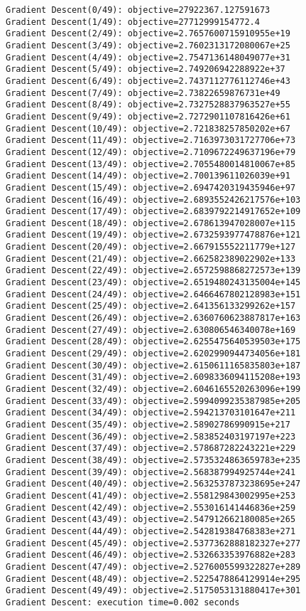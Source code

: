 \documentclass[11pt]{article}
\begin{document}
    \begin{Verbatim}[commandchars=\\\{\}]
Gradient Descent(0/49): objective=27922367.127591673
Gradient Descent(1/49): objective=27712999154772.4
Gradient Descent(2/49): objective=2.7657600715910955e+19
Gradient Descent(3/49): objective=2.7602313172080067e+25
Gradient Descent(4/49): objective=2.7547136148049077e+31
Gradient Descent(5/49): objective=2.749206942288922e+37
Gradient Descent(6/49): objective=2.7437112776112746e+43
Gradient Descent(7/49): objective=2.73822659876731e+49
Gradient Descent(8/49): objective=2.7327528837963527e+55
Gradient Descent(9/49): objective=2.7272901107816426e+61
Gradient Descent(10/49): objective=2.721838257850202e+67
Gradient Descent(11/49): objective=2.7163973031727706e+73
Gradient Descent(12/49): objective=2.7109672249637196e+79
Gradient Descent(13/49): objective=2.7055480014810067e+85
Gradient Descent(14/49): objective=2.700139611026039e+91
Gradient Descent(15/49): objective=2.6947420319435946e+97
Gradient Descent(16/49): objective=2.6893552426217576e+103
Gradient Descent(17/49): objective=2.6839792214917652e+109
Gradient Descent(18/49): objective=2.678613947028007e+115
Gradient Descent(19/49): objective=2.6732593977478876e+121
Gradient Descent(20/49): objective=2.667915552211779e+127
Gradient Descent(21/49): objective=2.662582389022902e+133
Gradient Descent(22/49): objective=2.6572598868272573e+139
Gradient Descent(23/49): objective=2.6519480243135004e+145
Gradient Descent(24/49): objective=2.6466467802128983e+151
Gradient Descent(25/49): objective=2.641356133299262e+157
Gradient Descent(26/49): objective=2.6360760623887817e+163
Gradient Descent(27/49): objective=2.630806546340078e+169
Gradient Descent(28/49): objective=2.6255475640539503e+175
Gradient Descent(29/49): objective=2.6202990944734056e+181
Gradient Descent(30/49): objective=2.6150611165835803e+187
Gradient Descent(31/49): objective=2.6098336094115208e+193
Gradient Descent(32/49): objective=2.6046165520263096e+199
Gradient Descent(33/49): objective=2.5994099235387985e+205
Gradient Descent(34/49): objective=2.594213703101647e+211
Gradient Descent(35/49): objective=2.58902786990915e+217
Gradient Descent(36/49): objective=2.583852403197197e+223
Gradient Descent(37/49): objective=2.578687282243221e+229
Gradient Descent(38/49): objective=2.5735324863659783e+235
Gradient Descent(39/49): objective=2.568387994925744e+241
Gradient Descent(40/49): objective=2.5632537873238695e+247
Gradient Descent(41/49): objective=2.558129843002995e+253
Gradient Descent(42/49): objective=2.553016141446836e+259
Gradient Descent(43/49): objective=2.547912662180085e+265
Gradient Descent(44/49): objective=2.542819384768383e+271
Gradient Descent(45/49): objective=2.5377362888182327e+277
Gradient Descent(46/49): objective=2.532663353976882e+283
Gradient Descent(47/49): objective=2.5276005599322827e+289
Gradient Descent(48/49): objective=2.5225478864129914e+295
Gradient Descent(49/49): objective=2.5175053131880417e+301
Gradient Descent: execution time=0.002 seconds
    \end{Verbatim}
\end{document}
